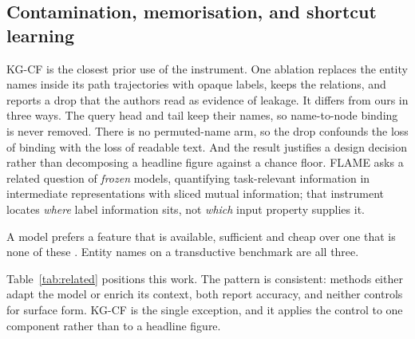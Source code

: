 \documentclass[conference]{IEEEtran}
\begin{document}
\subsection{Contamination, memorisation, and shortcut learning}

KG-CF \cite{kgcf} is the closest prior use of the
instrument. One ablation replaces the entity names inside its path trajectories
with opaque labels, keeps the relations, and reports a drop that the authors read
as evidence of leakage. It differs from ours in three ways. The query head and
tail keep their names, so name-to-node binding is never removed. There is no
permuted-name arm, so the drop confounds the loss of binding with the loss of
readable text. And the result justifies a design decision rather than
decomposing a headline figure against a chance floor. FLAME \cite{flame} asks a
related question of \emph{frozen} models, quantifying task-relevant information
in intermediate representations with sliced mutual information; that instrument
locates \emph{where} label information sits, not \emph{which} input property
supplies it.

A model prefers a feature that is available,
sufficient and cheap over one that is none of these \cite{geirhos2020}. Entity
names on a transductive benchmark are all three.

Table~\ref{tab:related} positions this work. The pattern is consistent: methods
either adapt the model or enrich its context, both report accuracy, and neither
controls for surface form. KG-CF is the single exception, and it applies the
control to one component rather than to a headline figure.
\end{document}
